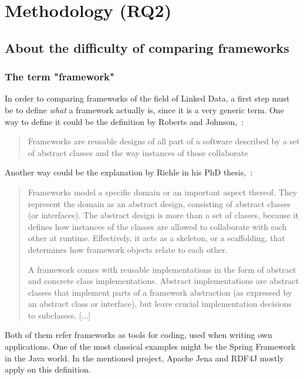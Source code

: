 \chapter{Methodology (RQ2)}
\section{About the difficulty of comparing frameworks}\label{def:framework}

\subsection{The term "framework"}

In order to comparing frameworks of the field of Linked Data, a first step must be to define \emph{what} a framework actually is, since it is a very generic term. One way to define it could be the definition by Roberts and Johnson,~\cite{roberts1996evolving}:

\begin{quotation}
Frameworks are reusable designs of all part of a software described by a set of abstract classes and the way instances of those collaborate
\end{quotation}

Another way could be the explanation by Riehle in his PhD thesis,~\cite{riehle2000framework}:

\begin{quotation}
Frameworks model a specific domain or an important aspect thereof. They represent the domain as an abstract design, consisting of abstract classes (or interfaces). The abstract design is more than a set of classes, because it defines how instances of the classes are allowed to collaborate with each other at runtime. Effectively, it acts as a skeleton, or a scaffolding, that determines how framework objects relate to each other.

A framework comes with reusable implementations in the form of abstract and concrete class implementations. Abstract implementations are abstract classes that implement parts of a framework abstraction (as expressed by an abstract class or interface), but leave crucial implementation decisions to subclasses. [...]
\end{quotation}

Both of them refer frameworks as tools for coding, used when writing own applications. One of the most classical examples might be the Spring Framework in the Java world. In the mentioned project, Apache Jena and RDF4J mostly apply on this definition.

